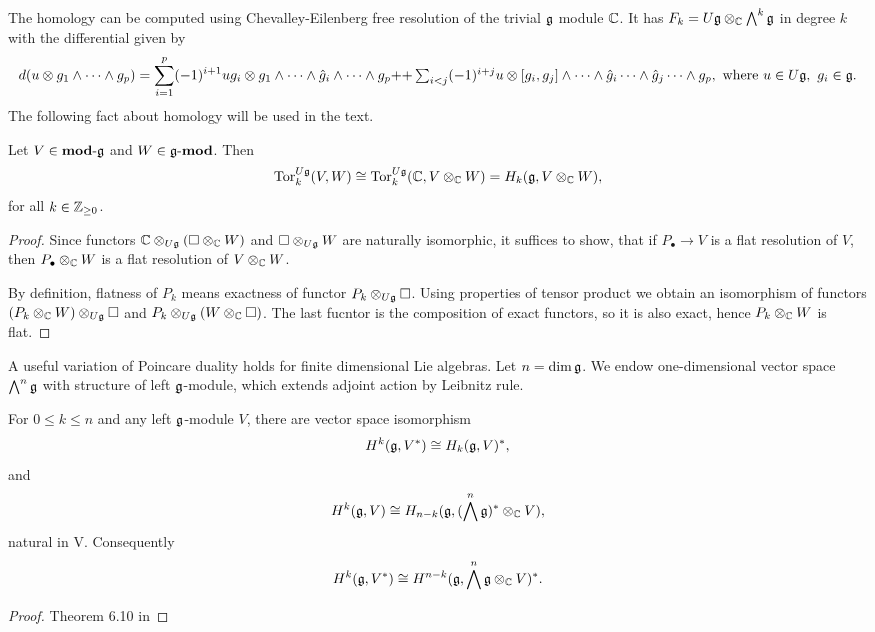 The homology can be computed using Chevalley-Eilenberg  free resolution of the trivial $\mathfrak{g}$
module $\mathbb{C}$. It has $F_k=U\mathfrak{g}\otimes_{\mathbb{C}} \bigwedge^k \mathfrak{g}$ in degree $k$ with the
differential given by
\begin{equation}
    d(u\otimes g_1 \wedge \cdots \wedge g_p) 
 = \sum_{i = 1}^p (-1)^{i+1} u g_i \otimes g_1 \wedge \cdots \wedge \hat{g}_i\wedge \cdots \wedge g_p  
+$$ $$+\sum_{i < j} (-1)^{i+j} u\otimes [g_i, g_j] \wedge \cdots \wedge \hat{g}_i\cdots \wedge
\hat{g}_j\cdots \wedge g_p,~\text{where } u\in U\lieg,~g_i \in \lieg.
\end{equation}
The following fact about homology will be used in the text.
\begin{lemma} \label{t:torhomology}
   Let $V \in \operatorname{\mathbf{mod-\mathfrak{g}}}$ and $W \in \operatorname{\mathbf{\mathfrak{g}-mod}}$. Then  
    \[
        \mathrm{Tor}_k^{U\mathfrak{g}}(V,W) \cong \mathrm{Tor}_k^{U\mathfrak{g}}(\mathbb{C},V\otimes_{\mathbb{C}} W) = H_k(\mathfrak{g}, V\otimes_{\mathbb{C}} W),
    \]
    for all $k\in \mathbb{Z}_{\geq 0}$.
\end{lemma}
\begin{proof}
    Since functors $\mathbb{C}\otimes_{U\mathfrak{g}}(\square \otimes_{\mathbb{C}} W)$ and $\square \otimes_{U\mathfrak{g}} W$
    are naturally isomorphic, it suffices to show, that if $P_\bullet \to V$ is a flat
    resolution of $V$, then $P_\bullet \otimes_{\mathbb{C}} W$ is a flat resolution of $V\otimes_{\mathbb{C}}
    W$.

    By definition, flatness of $P_k$ means exactness of functor $P_k\otimes_{U\mathfrak{g}}\square$. Using
    properties of tensor product we obtain an isomorphism of functors $(P_k\otimes_{\mathbb{C}} W) 
    \otimes_{U\mathfrak{g}} \square$ and $P_k\otimes_{U\mathfrak{g}} (W \otimes_{\mathbb{C}} \square)$. The last fucntor
    is the composition of exact functors, so it is also exact, hence $P_k\otimes_{\mathbb{C}} W$ is flat.
\end{proof}

A useful variation of Poincare duality holds for finite dimensional Lie algebras. Let $n = \dim
\mathfrak{g}$. We endow one-dimensional vector space $\bigwedge^n \mathfrak{g}$ 
with structure of left $\mathfrak{g}$-module, which extends adjoint action by Leibnitz rule. 

\begin{theorem} \label{t:poincare}
    For $0 \leq k \leq n$ and any left $\mathfrak{g}$-module $V$, there are vector space isomorphism 
    \[
        H^k(\mathfrak{g}, V^*) \cong H_k(\mathfrak{g}, V)^*,
    \]
    and
    \[
        H^k(\mathfrak{g}, V) \cong H_{n - k}(\mathfrak{g}, (\bigwedge^n \mathfrak{g})^*\otimes_{\mathbb{C}} V),
    \]
    natural in V. Consequently
    \[
        H^k(\mathfrak{g}, V^*) \cong H^{n - k}(\mathfrak{g},  \bigwedge^n \mathfrak{g}\otimes_{\mathbb{C}} V)^*. 
    \]
\end{theorem}
\begin{proof}
    Theorem 6.10 in 
\end{proof}
